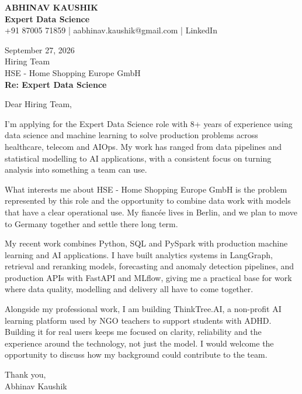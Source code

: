 \documentclass[10pt,a4paper]{article}
\begin{document}
\begin{center}
{\Large\bfseries ABHINAV KAUSHIK}\\[2pt]
{\bfseries Expert Data Science}\\[2pt]
+91 87005 71859 \quad | \quad aabhinav.kaushik@gmail.com \quad | \quad LinkedIn
\end{center}
\vspace{8pt}
September 27, 2026\\[6pt]
Hiring Team\\
HSE - Home Shopping Europe GmbH\\[4pt]
\textbf{Re: Expert Data Science}

Dear Hiring Team,

I’m applying for the Expert Data Science role with 8+ years of experience using data science and machine learning to solve production problems across healthcare, telecom and AIOps. My work has ranged from data pipelines and statistical modelling to AI applications, with a consistent focus on turning analysis into something a team can use.

What interests me about HSE - Home Shopping Europe GmbH is the problem represented by this role and the opportunity to combine data work with models that have a clear operational use. My fiancée lives in Berlin, and we plan to move to Germany together and settle there long term.

My recent work combines Python, SQL and PySpark with production machine learning and AI applications. I have built analytics systems in LangGraph, retrieval and reranking models, forecasting and anomaly detection pipelines, and production APIs with FastAPI and MLflow, giving me a practical base for work where data quality, modelling and delivery all have to come together.

Alongside my professional work, I am building ThinkTree.AI, a non-profit AI learning platform used by NGO teachers to support students with ADHD. Building it for real users keeps me focused on clarity, reliability and the experience around the technology, not just the model. I would welcome the opportunity to discuss how my background could contribute to the team.

Thank you,\\
Abhinav Kaushik
\end{document}
